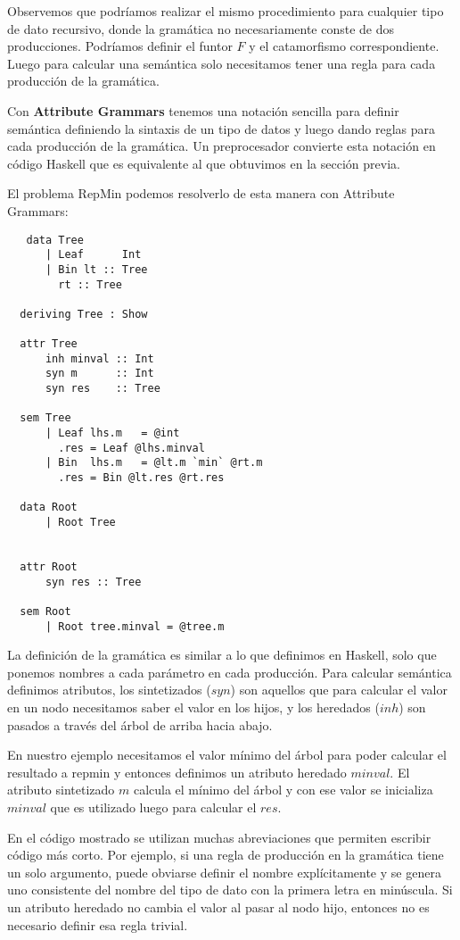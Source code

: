 \documentclass[a4paper,10pt]{article}
\begin{document}
  Observemos que podríamos realizar el mismo procedimiento para cualquier tipo de dato recursivo, donde
  la gramática no necesariamente conste de dos producciones. Podríamos definir el funtor $F$ 
  y el catamorfismo correspondiente. Luego para calcular una semántica solo necesitamos tener una regla
  para cada producción de la gramática.
  
  Con \textbf{Attribute Grammars} tenemos una notación sencilla para definir semántica definiendo la sintaxis
  de un tipo de datos y luego dando reglas para cada producción de la gramática. Un preprocesador
  convierte esta notación en código Haskell que es equivalente al que obtuvimos en la sección previa.
  
  El problema RepMin podemos resolverlo de esta manera con Attribute Grammars:
  
  \begin{lstlisting}
   data Tree
      | Leaf      Int
      | Bin lt :: Tree
	    rt :: Tree

  deriving Tree : Show
	  
  attr Tree
      inh minval :: Int
      syn m      :: Int
      syn res    :: Tree
      
  sem Tree
      | Leaf lhs.m   = @int
		.res = Leaf @lhs.minval
      | Bin  lhs.m   = @lt.m `min` @rt.m
		.res = Bin @lt.res @rt.res
		
  data Root
      | Root Tree
      
      
  attr Root
      syn res :: Tree
      
  sem Root
      | Root tree.minval = @tree.m
  \end{lstlisting}

  La definición de la gramática es similar a lo que definimos en Haskell, solo que ponemos nombres
  a cada parámetro en cada producción. Para calcular semántica definimos atributos, los sintetizados ($syn$)
  son aquellos que para calcular el valor en un nodo necesitamos saber el valor en los hijos, y los heredados ($inh$)
  son pasados a través del árbol de arriba hacia abajo.
  
  En nuestro ejemplo necesitamos el valor mínimo del árbol para poder calcular el resultado a repmin y entonces definimos
  un atributo heredado $minval$. El atributo sintetizado $m$ calcula el mínimo del árbol y con ese valor se inicializa
  $minval$ que es utilizado luego para calcular el $res$.
  
  En el código mostrado se utilizan muchas abreviaciones que permiten escribir código más corto. Por ejemplo, si una regla
  de producción en la gramática tiene un solo argumento, puede obviarse definir el nombre explícitamente y se genera uno
  consistente del nombre del tipo de dato con la primera letra en minúscula. Si un atributo heredado no cambia el valor
  al pasar al nodo hijo, entonces no es necesario definir esa regla trivial.
  
\end{document}
